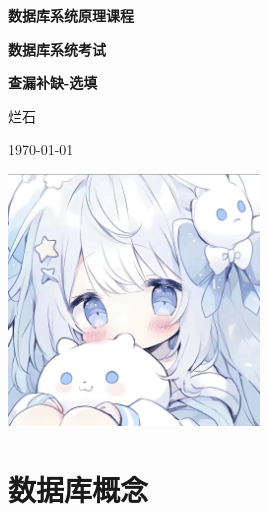 \documentclass[a4paper,12pt,UTF8,fontset=none]{ctexart}
\newcounter{mycounter}
\let\oldsection\section
\renewcommand{\section}{%
  \setcounter{mycounter}{0}%
  \oldsection%
}
\begin{document}
\begin{titlepage}
    \centering
    \vspace*{\fill}
    {\Large\bfseries 数据库系统原理课程\par}
    \vspace{2cm}
    {\LARGE\bfseries 数据库系统考试\par}
    \vspace{2cm}
    {\Large\bfseries 查漏补缺-选填\par}
    \vspace{2cm}
    {\Large 烂石\par}
    \vspace{1cm}
    {\large \today \par}
    \vspace{4cm}
    \includegraphics[width=0.5\textwidth]{static/images/logo.jpg}
    \vspace*{\fill}
    \thispagestyle{empty} %
    \newpage
\end{titlepage}
\section{数据库概念}
\end{document}
